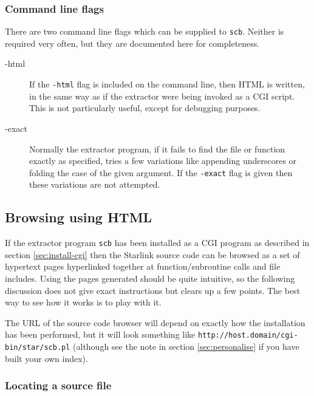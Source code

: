 \documentclass[twoside,11pt]{article}
\newcommand{\xlabel}[1]{}
\renewcommand{\_}{\texttt{\symbol{95}}}
\begin{document}
\subsubsection{\xlabel{sec:extract-flags}\label{sec:extract-flags}Command line flags}

There are two command line flags which can be supplied to {\tt scb}.
Neither is required very often, but they are documented here for completeness.
\begin{description}
\item[-html]
If the {\tt -html} flag is included on the command line,
then HTML is written, in the same way as if the extractor were
being invoked as a CGI script.  This is not particularly useful,
except for debugging purposes.
\item[-exact]
Normally the extractor program, if it fails to find the file or
function exactly as specified, tries a few variations like appending
underscores or folding the case of the given argument.
If the {\tt -exact} flag is given then these variations are not attempted.
\end{description}




\subsection{\xlabel{sec:extract-cgi}\label{sec:extract-cgi}Browsing using HTML}

If the extractor program {\tt scb} has been installed
as a CGI program as described in section \ref{sec:install-cgi}
then the Starlink source code can be browsed as a set of
hypertext pages hyperlinked together
at function/subroutine calls and file includes.
Using the pages generated should be quite intuitive,
so the following discussion does not give exact instructions
but clears up a few points.
The best way to see how it works is to play with it.

The URL of the source code browser will depend on exactly how
the installation has been performed, but it will look something
like {\tt http://host.domain/cgi-bin/star/scb.pl}
(although see the note in section \ref{sec:personalise}
if you have built your own index).


\subsubsection{\xlabel{BROWSER-HELP}\label{BROWSER-HELP}Locating a source file}
\end{document}
